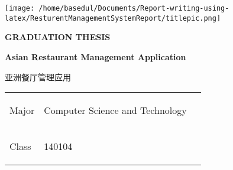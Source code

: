 \documentclass[12pt,a4paper]{article}
\newcommand{\zh}[1]{\begin{CJK}{UTF8}{gbsn}#1\end{CJK}}
\begin{document}
	
	
	\begin{titlepage}
	\begin{center}
	\centering
	\noindent\begin{minipage}{0.25\textwidth}%
\texttt{[image: /home/basedul/Documents/Report-writing-using-latex/ResturentManagementSystemReport/titlepic.png]}
\end{minipage}
\hfill
\begin{minipage}{0.7\textwidth}
{\fontsize{24}{5}\selectfont \textbf{GRADUATION THESIS}
}

\end{minipage}
	
\par\vspace{0cm}
	{\fontsize{22}{10}\selectfont \begin{center}
	\textbf{Asian Restaurant Management Application}
	\end{center}}
	{\fontsize{20}{10}\selectfont \begin{center}
	\zh{亚洲餐厅管理应用}
	\end{center}}
	\vspace{1cm}
	
	\begin{table}[ht]
	\center
	\begin{tabular}{M{4cm}M{8cm}N}
	
	{\fontsize{16}{10}\selectfont \begin{flushleft}
	Major
	\end{flushleft}} & {\fontsize{16}{10}\selectfont \begin{flushleft}
	Computer Science and Technology
	\end{flushleft}}&\\[0.1pt]
	
	{\fontsize{16}{10}\selectfont \begin{flushleft}
	Class
	\end{flushleft}} & {\fontsize{16}{10}\selectfont \begin{flushleft}
	140104
	\end{flushleft}}&\\[0.1pt]
	

\end{tabular}
\end{table}
\end{center}
\end{titlepage}
\end{document}
